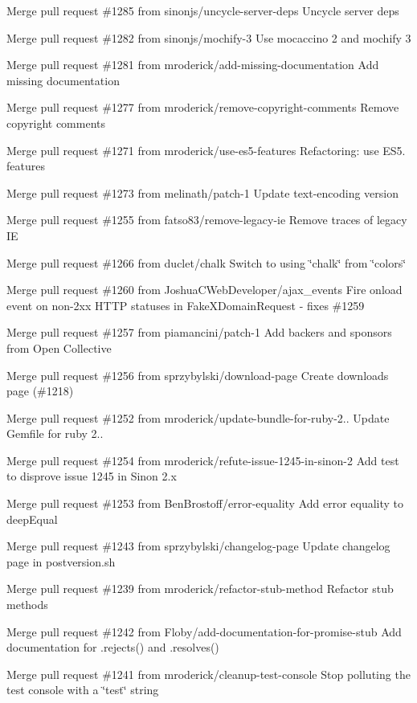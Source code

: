 \begin{DoxyItemize}
\item Merge pull request \#1285 from sinonjs/uncycle-\/server-\/deps Uncycle server deps
\item Merge pull request \#1282 from sinonjs/mochify-\/3 Use mocaccino 2 and mochify 3
\item Merge pull request \#1281 from mroderick/add-\/missing-\/documentation Add missing documentation
\item Merge pull request \#1277 from mroderick/remove-\/copyright-\/comments Remove copyright comments
\item Merge pull request \#1271 from mroderick/use-\/es5-\/features Refactoring\+: use E\+S5. features
\item Merge pull request \#1273 from melinath/patch-\/1 Update text-\/encoding version
\item Merge pull request \#1255 from fatso83/remove-\/legacy-\/ie Remove traces of legacy IE
\item Merge pull request \#1266 from duclet/chalk Switch to using \char`\"{}chalk\char`\"{} from \char`\"{}colors\char`\"{}
\item Merge pull request \#1260 from Joshua\+C\+Web\+Developer/ajax\+\_\+events Fire onload event on non-\/2xx H\+T\+TP statuses in Fake\+X\+Domain\+Request -\/ fixes \#1259
\item Merge pull request \#1257 from piamancini/patch-\/1 Add backers and sponsors from Open Collective
\item Merge pull request \#1256 from sprzybylski/download-\/page Create downloads page (\#1218)
\item Merge pull request \#1252 from mroderick/update-\/bundle-\/for-\/ruby-\/2.. Update Gemfile for ruby 2..
\item Merge pull request \#1254 from mroderick/refute-\/issue-\/1245-\/in-\/sinon-\/2 Add test to disprove issue 1245 in Sinon 2.\+x
\item Merge pull request \#1253 from Ben\+Brostoff/error-\/equality Add error equality to deep\+Equal
\item Merge pull request \#1243 from sprzybylski/changelog-\/page Update changelog page in postversion.\+sh
\item Merge pull request \#1239 from mroderick/refactor-\/stub-\/method Refactor stub methods
\item Merge pull request \#1242 from Floby/add-\/documentation-\/for-\/promise-\/stub Add documentation for .rejects() and .resolves()
\item Merge pull request \#1241 from mroderick/cleanup-\/test-\/console Stop polluting the test console with a \char`\"{}test\char`\"{} string

\end{DoxyItemize}
